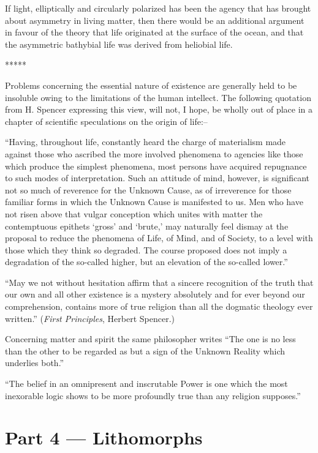 \documentclass[a4paper, 12pt, oneside]{article}
\begin{document}
If light, elliptically and circularly polarized has been the agency that has brought about asymmetry in living matter, then there would be an additional argument in favour of the theory that life originated at the surface of the ocean, and that the asymmetric bathybial life was derived from heliobial life.

\centerline{*\hspace{15mm}*\hspace{15mm}*\hspace{15mm}*\hspace{15mm}*}
\bigskip

Problems concerning the essential nature of existence are generally held to be insoluble owing to the limitations of the human intellect. The following quotation from H. Spencer expressing this view, will not, I hope, be wholly out of place in a chapter of scientific speculations on the origin of life:--

``Having, throughout life, constantly heard the charge of materialism made against those who ascribed the more involved phenomena to agencies like those which produce the simplest phenomena, most persons have acquired repugnance to such modes of interpretation. Such an attitude of mind, however, is significant not so much of reverence for the Unknown Cause, as of irreverence for those familiar forms in which the Unknown Cause is manifested to us. Men who have not risen above that vulgar conception which unites with matter the contemptuous epithets `gross' and `brute,' may naturally feel dismay at the proposal to reduce the phenomena of Life, of Mind, and of Society, to a level with those which they think so degraded. The course proposed does not imply a degradation of the so-called higher, but an elevation of the so-called lower.''

``May we not without hesitation affirm that a sincere recognition of the truth that our own and all other existence is a mystery absolutely and for ever beyond our comprehension, contains more of true religion than all the dogmatic theology ever written.'' (\emph{First Principles}, Herbert Spencer.)

Concerning matter and spirit the same philosopher writes ``The one is no less than the other to be regarded as but a sign of the Unknown Reality which underlies both.''

``The belief in an omnipresent and inscrutable Power is one which the most inexorable logic shows to be more profoundly true than any religion supposes.''
\clearpage
\section{Part 4 --- Lithomorphs}
\end{document}
